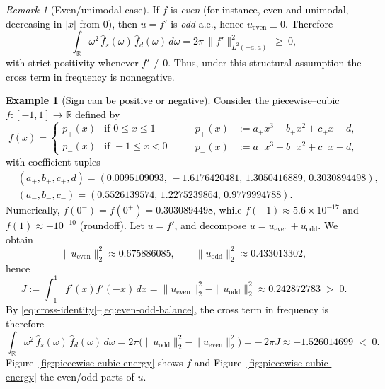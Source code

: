 \documentclass[preprint,hidelinks,authoryear]{elsarticle}
\theoremstyle{plain}
\theoremstyle{definition}
\newtheorem{example}[theorem]{Example}
\theoremstyle{remark}
\newtheorem{remark}[theorem]{Remark}
\begin{document}
\textcolor{black}{
\begin{remark}[Even/unimodal case]
\label{rem:unimodal}
If $f$ is \emph{even} (for instance, even and unimodal, decreasing in $|x|$ from $0$), then $u=f'$ is \emph{odd} a.e., hence $u_{\mathrm{even}}\equiv 0$. Therefore
$$
\int_{\mathbb{R}}\omega^2\,\hat f_s(\omega)\,\hat f_d(\omega)\,d\omega
=2\pi\,\|f'\|_{L^2(-a,a)}^2\ \ge\ 0,
$$
with strict positivity whenever $f'\not\equiv 0$. Thus, under this structural assumption the cross term in frequency is nonnegative.
\end{remark}
\begin{example}[Sign can be positive or negative]\label{ex:sign-balance}
Consider the piecewise–cubic $f:[-1,1]\to\mathbb{R}$ defined by
$$
f(x)=
\begin{cases}
p_+(x) &\text{if }  0\le x\le 1\\
p_-(x) &\text{if } -1\le x<0
\end{cases}
\qquad
\begin{aligned}
p_+(x)&:=a_+x^3+b_+x^2+c_+x+d,\\
p_-(x)&:=a_-x^3+b_-x^2+c_-x+d,
\end{aligned}
$$
with coefficient tuples
\begin{align*}
&(a_+,b_+,c_+,d)=(0.0095109093,\,-1.6176420481,\,1.3050416889,\,0.3030894498),\\
&(a_-,b_-,c_-)=(0.5526139574,\,1.2275239864,\,0.9779994788).
\end{align*}
Numerically, $f(0^-)=f(0^+)=0.3030894498$, while $f(-1)\approx 5.6\!\times\!10^{-17}$ and $f(1)\approx -10^{-10}$ (roundoff).  
Let $u=f'$, and decompose $u=u_{\mathrm{even}}+u_{\mathrm{odd}}$. We obtain
$$
\|u_{\mathrm{even}}\|_2^2 \approx 0.675886085,\qquad
\|u_{\mathrm{odd}}\|_2^2  \approx 0.433013302,
$$
hence
$$
J:=\int_{-1}^1 f'(x)f'(-x)\,dx
= \|u_{\mathrm{even}}\|_2^2-\|u_{\mathrm{odd}}\|_2^2
\approx 0.242872783 \;>\; 0.
$$
By \eqref{eq:cross-identity}–\eqref{eq:even-odd-balance}, the cross term in frequency is therefore
$$
\int_{\mathbb{R}}\omega^2\,\hat f_s(\omega)\,\hat f_d(\omega)\,d\omega
= 2\pi\big(\|u_{\mathrm{odd}}\|_2^2-\|u_{\mathrm{even}}\|_2^2\big)
= -\,2\pi J
\approx -1.526014699 \;<\; 0.
$$
Figure~\ref{fig:piecewise-cubic-energy} shows $f$ and
Figure~\ref{fig:piecewise-cubic-energy} the even/odd parts of $u$.
\end{example}
}
\end{document}
